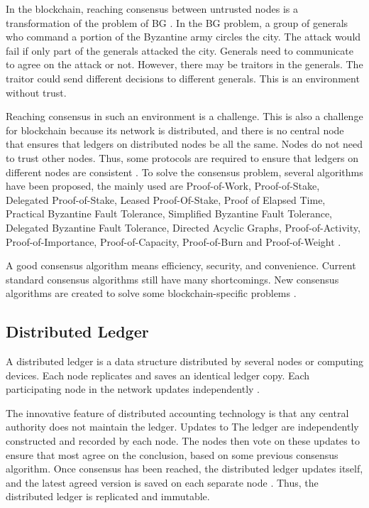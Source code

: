 In the blockchain, reaching consensus between untrusted nodes is a transformation of the problem of \ac{BG} \cite{lamport1982byzantine}. In the BG problem, a group of generals who command a portion of the Byzantine army circles the city. The attack would fail if only part of the generals attacked the city. Generals need to communicate to agree on the attack or not. However, there may be traitors in the generals. The traitor could send different decisions to different generals. This is an environment without trust.

Reaching consensus in such an environment is a challenge. This is also a challenge for blockchain because its network is distributed, and there is no central node that ensures that ledgers on distributed nodes be all the same. Nodes do not need to trust other nodes. Thus, some protocols are required to ensure that ledgers on different nodes are consistent \cite{kostarev2017review}. To solve the consensus problem, several algorithms have been proposed, the mainly used are Proof-of-Work, Proof-of-Stake, Delegated Proof-of-Stake, Leased Proof-Of-Stake, Proof of Elapsed Time, Practical Byzantine Fault Tolerance, Simplified Byzantine Fault Tolerance, Delegated Byzantine Fault Tolerance, Directed Acyclic Graphs, Proof-of-Activity, Proof-of-Importance, Proof-of-Capacity, Proof-of-Burn and Proof-of-Weight \cite{mingxiao2017review}.

A good consensus algorithm means efficiency, security, and convenience. Current standard consensus algorithms still have many shortcomings. New consensus algorithms are created to solve some blockchain-specific problems \cite{zheng2016blockchain}.


\subsection{Distributed Ledger}\label{sec:livro}
A distributed ledger is a data structure distributed by several nodes or computing devices. Each node replicates and saves an identical ledger copy. Each participating node in the network updates independently \cite{greve2018blockchain}.

The innovative feature of distributed accounting technology is that any central authority does not maintain the ledger. Updates to The ledger are independently constructed and recorded by each node. The nodes then vote on these updates to ensure that most agree on the conclusion, based on some previous consensus algorithm. Once consensus has been reached, the distributed ledger updates itself, and the latest agreed version is saved on each separate node \cite{swan2015blockchain}. Thus, the distributed ledger is replicated and immutable. 

